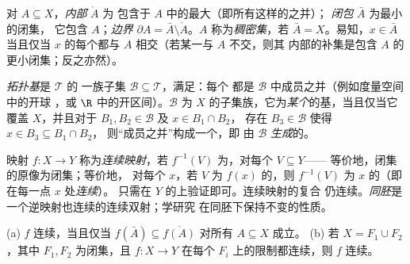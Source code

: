 \begin{definition}\label{def:b3:topology:interior}
对 $A \subseteq X$，\emph{内部} $\mathring A$ 为
包含于 $A$ 中的最大（即所有这样的之并）；
\emph{闭包} $\bar A$ 为最小的闭集，
它包含 $A$；\emph{边界} $\partial A = \bar A
\setminus \mathring A$。$A$ 称为\emph{稠密集}，若
$\bar A = X$。易知，$x \in \bar A$ 当且仅当
$x$ 的每个都与 $A$ 相交（若某一与 $A$ 不交，则其
内部的补集是包含 $A$ 的更小闭集；反之亦然）。
\end{definition}

\begin{definition}\label{def:b3:topology:basis}
\emph{拓扑基}是 $\mathcal T$ 的
一族子集 $\mathcal B \subseteq \mathcal T$，满足：每个
都是 $\mathcal B$ 中成员之并（例如度量空间中的开球
，或 $\R$ 中的开区间）。$\mathcal B$
为 $X$ 的子集族，它为\emph{某个}的基，当且仅当它覆盖
$X$，并且对于 $B_1, B_2 \in \mathcal B$ 及 $x \in B_1 \cap B_2$，
存在 $B_3 \in \mathcal B$ 使得 $x \in B_3 \subseteq B_1\cap B_2$，
则“成员之并”构成一个，即
由 $\mathcal B$ \emph{生成}的。
\end{definition}

\begin{definition}\label{def:b3:topology:continuity}
映射 $f \colon X \to Y$ 称为\emph{连续映射}，若
$f^{-1}(V)$ 为，对每个 $V \subseteq Y$——
等价地，闭集的原像为闭集；等价地，
对每个 $x$，若 $V$ 为 $f(x)$ 的，则 $f^{-1}(V)$
为 $x$ 的（即在每一点 $x$ 处\emph{连续}）。
只需在 $Y$ 的上验证即可。连续映射的复合
仍连续。\emph{同胚}是
一个逆映射也连续的连续双射；学研究
在同胚下保持不变的性质。
\end{definition}

\begin{proposition}[连续性与闭包；粘合]
\label{prop:b3:topology:gluing}
(a) $f$ 连续，当且仅当 $f(\bar A) \subseteq \overline{f(A)}$
对所有 $A \subseteq X$ 成立。
(b) 若 $X = F_1 \cup F_2$，其中 $F_1, F_2$ 为闭集，且 $f\colon X
\to Y$ 在每个 $F_i$ 上的限制都连续，则 $f$
连续。
\end{proposition}

